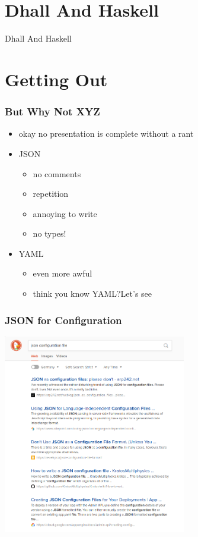 \documentclass{beamer}
\begin{document}
 \section{Dhall And Haskell}

 \begin{frame}
   {\Huge Dhall And Haskell}
 \end{frame}

 \section{Getting Out}

 \begin{frame}
   \frametitle{But Why Not XYZ}
   \begin{itemize}
   \item okay no presentation is complete without a rant
   \item JSON
     \begin{itemize}
     \item no comments
     \item repetition
     \item annoying to write
     \item no types!
     \end{itemize}
   \item YAML
     \begin{itemize}
     \item even more awful
     \item think you know YAML?\@ Let's see
     \end{itemize}
   \end{itemize}
 \end{frame}

 \begin{frame}
   \frametitle{JSON for Configuration}
   \begin{center}
     \includegraphics[width=0.6\textwidth]{static-images/duckduckgo-dont-use-json.png}
   \end{center}
 \end{frame}
\end{document}
